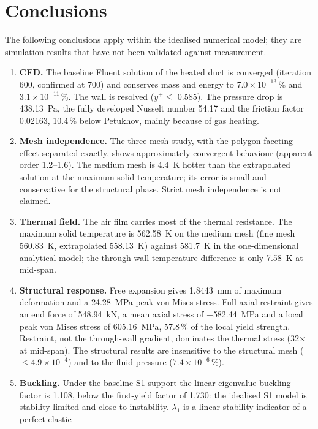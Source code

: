 \chapter{Conclusions}\label{ch:conclusions}
The following conclusions apply within the idealised numerical model; they are simulation results that have not been
validated against measurement.

\begin{enumerate}
\item \textbf{CFD.} The baseline Fluent solution of the heated duct is converged (iteration 600, confirmed at 700) and conserves mass and
      energy to $7.0\times10^{-13}$\,\% and $3.1\times10^{-11}$\,\%. The wall is resolved ($y^+ \le$ 0.585). The pressure drop is 438.13~Pa, the
      fully developed Nusselt number 54.17 and the friction factor 0.02163, 10.4\,\% below Petukhov, mainly because of gas heating.
\item \textbf{Mesh independence.} The three-mesh study, with the polygon-faceting effect separated exactly, shows approximately convergent
      behaviour (apparent order 1.2--1.6). The medium mesh is 4.4~K hotter than the extrapolated solution at the maximum solid temperature; its
      error is small and conservative for the structural phase. Strict mesh independence is not claimed.
\item \textbf{Thermal field.} The air film carries most of the thermal resistance. The maximum solid temperature is 562.58~K on the medium mesh (fine mesh
      560.83~K, extrapolated 558.13~K) against 581.7~K in the one-dimensional analytical model; the through-wall temperature difference is only
      7.58~K at mid-span.
\item \textbf{Structural response.} Free expansion gives 1.8443~mm of maximum deformation and a 24.28~MPa peak von Mises stress. Full axial
      restraint gives an end force of 548.94~kN, a mean axial stress of $-$582.44~MPa and a local peak von Mises stress of 605.16~MPa,
      57.8\,\% of the local yield strength. Restraint, not the through-wall gradient, dominates the thermal stress (32$\times$ at mid-span).
      The structural results are insensitive to the structural mesh ($\le 4.9\times10^{-4}$) and to the fluid pressure ($7.4\times10^{-6}$\,\%).
\item \textbf{Buckling.} Under the baseline S1 support the linear eigenvalue buckling factor is 1.108, below the first-yield factor of 1.730:
      the idealised S1 model is stability-limited and close to instability. $\lambda_1$ is a linear stability indicator of a perfect elastic

\end{enumerate}
